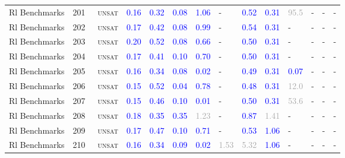 \begin{center}
{\begin{longtable}{@{}llllllllllllll@{}}
Rl Benchmarks & 201 & ~\textsc{unsat} & \textcolor{blue}{0.16} & \textcolor{blue}{0.32} & \textcolor{blue}{0.08} & \textcolor{blue}{1.06} & - & \textcolor{blue}{0.52} & \textcolor{blue}{0.31} & \textcolor{darkgray}{95.5} & - & - & - \\
Rl Benchmarks & 202 & ~\textsc{unsat} & \textcolor{blue}{0.17} & \textcolor{blue}{0.42} & \textcolor{blue}{0.08} & \textcolor{blue}{0.99} & - & \textcolor{blue}{0.54} & \textcolor{blue}{0.31} & - & - & - & - \\
Rl Benchmarks & 203 & ~\textsc{unsat} & \textcolor{blue}{0.20} & \textcolor{blue}{0.52} & \textcolor{blue}{0.08} & \textcolor{blue}{0.66} & - & \textcolor{blue}{0.50} & \textcolor{blue}{0.31} & - & - & - & - \\
Rl Benchmarks & 204 & ~\textsc{unsat} & \textcolor{blue}{0.17} & \textcolor{blue}{0.41} & \textcolor{blue}{0.10} & \textcolor{blue}{0.70} & - & \textcolor{blue}{0.50} & \textcolor{blue}{0.31} & - & - & - & - \\
Rl Benchmarks & 205 & ~\textsc{unsat} & \textcolor{blue}{0.16} & \textcolor{blue}{0.34} & \textcolor{blue}{0.08} & \textcolor{blue}{0.02} & - & \textcolor{blue}{0.49} & \textcolor{blue}{0.31} & \textcolor{blue}{0.07} & - & - & - \\
Rl Benchmarks & 206 & ~\textsc{unsat} & \textcolor{blue}{0.15} & \textcolor{blue}{0.52} & \textcolor{blue}{0.04} & \textcolor{blue}{0.78} & - & \textcolor{blue}{0.48} & \textcolor{blue}{0.31} & \textcolor{darkgray}{12.0} & - & - & - \\
Rl Benchmarks & 207 & ~\textsc{unsat} & \textcolor{blue}{0.15} & \textcolor{blue}{0.46} & \textcolor{blue}{0.10} & \textcolor{blue}{0.01} & - & \textcolor{blue}{0.50} & \textcolor{blue}{0.31} & \textcolor{darkgray}{53.6} & - & - & - \\
Rl Benchmarks & 208 & ~\textsc{unsat} & \textcolor{blue}{0.18} & \textcolor{blue}{0.35} & \textcolor{blue}{0.35} & \textcolor{darkgray}{1.23} & - & \textcolor{blue}{0.87} & \textcolor{darkgray}{1.41} & - & - & - & - \\
Rl Benchmarks & 209 & ~\textsc{unsat} & \textcolor{blue}{0.17} & \textcolor{blue}{0.47} & \textcolor{blue}{0.10} & \textcolor{blue}{0.71} & - & \textcolor{blue}{0.53} & \textcolor{blue}{1.06} & - & - & - & - \\
Rl Benchmarks & 210 & ~\textsc{unsat} & \textcolor{blue}{0.16} & \textcolor{blue}{0.34} & \textcolor{blue}{0.09} & \textcolor{blue}{0.02} & \textcolor{darkgray}{1.53} & \textcolor{darkgray}{5.32} & \textcolor{blue}{1.06} & - & - & - & - \\

\end{longtable}}
\end{center}
